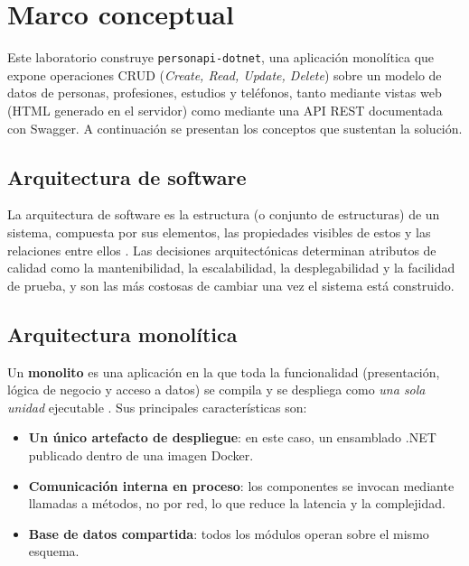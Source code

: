 \documentclass[12pt,letterpaper]{article}
\begin{document}
\tableofcontents
\newpage

\section{Marco conceptual}

Este laboratorio construye \texttt{personapi-dotnet}, una aplicación monolítica que
expone operaciones CRUD (\emph{Create, Read, Update, Delete}) sobre un modelo de datos de
personas, profesiones, estudios y teléfonos, tanto mediante vistas web (HTML generado en el
servidor) como mediante una API REST documentada con Swagger. A continuación se presentan
los conceptos que sustentan la solución.

\subsection{Arquitectura de software}
La arquitectura de software es la estructura (o conjunto de estructuras) de un sistema,
compuesta por sus elementos, las propiedades visibles de estos y las relaciones entre
ellos \cite{bass}. Las decisiones arquitectónicas determinan atributos de calidad como la
mantenibilidad, la escalabilidad, la desplegabilidad y la facilidad de prueba, y son las
más costosas de cambiar una vez el sistema está construido.

\subsection{Arquitectura monolítica}
Un \textbf{monolito} es una aplicación en la que toda la funcionalidad (presentación,
lógica de negocio y acceso a datos) se compila y se despliega como \emph{una sola unidad}
ejecutable \cite{richardson}. Sus principales características son:

\begin{itemize}[itemsep=2pt]
  \item \textbf{Un único artefacto de despliegue}: en este caso, un ensamblado .NET
        publicado dentro de una imagen Docker.
  \item \textbf{Comunicación interna en proceso}: los componentes se invocan mediante
        llamadas a métodos, no por red, lo que reduce la latencia y la complejidad.
  \item \textbf{Base de datos compartida}: todos los módulos operan sobre el mismo esquema.
\end{itemize}
\end{document}
